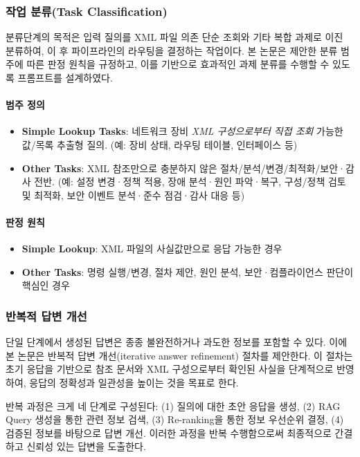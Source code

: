 \documentclass[twocolumn, 10pt]{article}
\begin{document}
\subsubsection{작업 분류(Task Classification)}
분류단계의 목적은 입력 질의를 XML 파일 의존 단순 조회와 기타 복합 과제로 이진 분류하여,
이 후 파이프라인의 라우팅을 결정하는 작업이다. 본 논문은 제안한 분류 범주에 따른
판정 원칙을 규정하고, 이를 기반으로 효과적인 과제 분류를 수행할 수 있도록
프롬프트를 설계하였다.
\paragraph{범주 정의}
\begin{itemize}
\item \textbf{Simple Lookup Tasks}: 네트워크 장비 \emph{XML 구성으로부터
  직접 조회} 가능한 값/목록 추출형 질의. (예: 장비 상태, 라우팅 테이블, 인터페이스
  등)

\item \textbf{Other Tasks}: XML 참조만으로 충분하지 않은 절차/분석/변경/최적화/보안·감사
  전반. (예: 설정 변경·정책 적용, 장애 분석·원인 파악·복구, 구성/정책 검토
  및 최적화, 보안 이벤트 분석·준수 점검·감사 대응 등)
\end{itemize}

\paragraph{판정 원칙}
\begin{itemize}
\item \textbf{Simple Lookup}: XML 파일의 사실값만으로 응답 가능한 경우

\item \textbf{Other Tasks}: 명령 실행/변경, 절차 제안, 원인 분석,
  보안·컴플라이언스 판단이 핵심인 경우
\end{itemize}

\subsubsection{반복적 답변 개선}

단일 단계에서 생성된 답변은 종종 불완전하거나 과도한 정보를 포함할 수 있다. 이에
본 논문은 반복적 답변 개선(iterative answer refinement) 절차를 제안한다. 이 절차는
초기 응답을 기반으로 참조 문서와 XML 구성으로부터 확인된 사실을 단계적으로 반영하여,
응답의 정확성과 일관성을 높이는 것을 목표로 한다.

반복 과정은 크게 네 단계로 구성된다: (1) 질의에 대한 초안 응답을 생성, (2) RAG
Query 생성을 통한 관련 정보 검색, (3) Re-ranking을 통한 정보 우선순위 결정, (4)
검증된 정보를 바탕으로 답변 개선. 이러한 과정을 반복 수행함으로써 최종적으로 간결하고
신뢰성 있는 답변을 도출한다.
\end{document}
